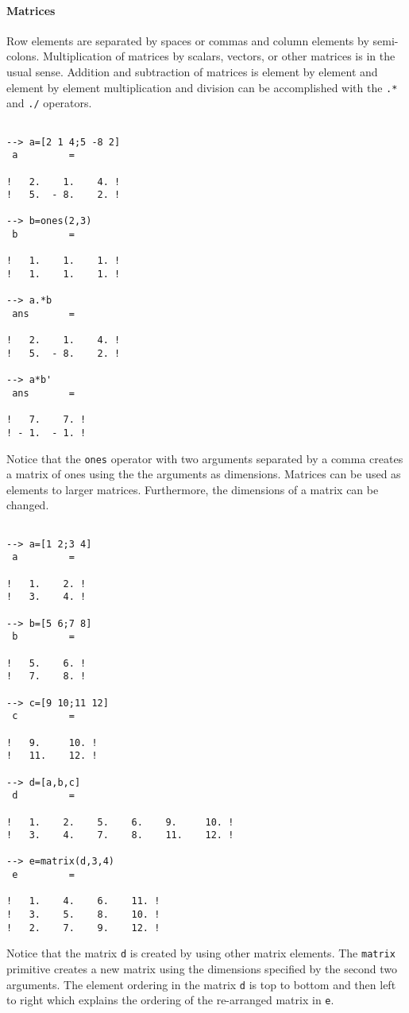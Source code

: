 \paragraph{Matrices}
Row elements are separated by spaces
or commas and column elements by semi-colons.  Multiplication
of matrices by scalars, vectors, or other matrices is in the usual
sense.  Addition and
subtraction of matrices is element by element and element by element
multiplication and division can be accomplished with the {\tt .*}
and {\tt ./} operators.
\begin{verbatim}
 
--> a=[2 1 4;5 -8 2]
 a         =
 
!   2.    1.    4. !
!   5.  - 8.    2. !
 
--> b=ones(2,3)
 b         =
 
!   1.    1.    1. !
!   1.    1.    1. !
 
--> a.*b
 ans       =
 
!   2.    1.    4. !
!   5.  - 8.    2. !
 
--> a*b'
 ans       =
 
!   7.    7. !
! - 1.  - 1. !
\end{verbatim}
Notice that the {\tt ones}
operator with two arguments separated
by a comma creates a matrix of ones using the the arguments as
dimensions.
Matrices can be used as elements to larger 
matrices.  Furthermore,
the dimensions of a matrix can be changed.
\begin{verbatim}
 
--> a=[1 2;3 4]
 a         =
 
!   1.    2. !
!   3.    4. !
 
--> b=[5 6;7 8]
 b         =
 
!   5.    6. !
!   7.    8. !
 
--> c=[9 10;11 12]
 c         =
 
!   9.     10. !
!   11.    12. !
 
--> d=[a,b,c]
 d         =
 
!   1.    2.    5.    6.    9.     10. !
!   3.    4.    7.    8.    11.    12. !
 
--> e=matrix(d,3,4)
 e         =
 
!   1.    4.    6.    11. !
!   3.    5.    8.    10. !
!   2.    7.    9.    12. !
\end{verbatim}
Notice that the matrix {\tt d} is created by using other matrix
elements.  The {\tt matrix} 
primitive creates a new matrix using
the dimensions specified by the second two arguments.  The element
ordering in the matrix {\tt d} is top to bottom and then left to right
which explains the ordering of the re-arranged matrix in {\tt e}.

